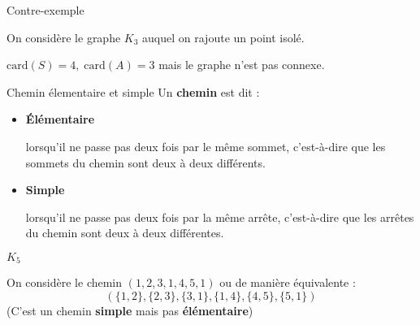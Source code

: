   \begin{Example}{Contre-exemple}{}

  On considère le graphe $K_3$ auquel on rajoute un point isolé.
  \begin{center}
  \end{center}
  $\mathrm{car d}(S) = 4,\; \mathrm{car d}(A) = 3$ mais le graphe n'est pas connexe.
  \end{Example}

  \begin{Definition}[colbacktitle=red!75!black]{Chemin élementaire et simple}{}
  Un \textbf{chemin} est dit :
  \begin{itemize}
      \item \textbf{Élémentaire}
          
          lorsqu'il ne passe pas deux fois par le même sommet, c'est-à-dire que les sommets du chemin sont deux à deux différents.

      \item \textbf{Simple}

          lorsqu'il ne passe pas deux fois par la même arrête, c'est-à-dire que les arrêtes du chemin sont deux à deux différentes.
  \end{itemize}
  \end{Definition}

  \begin{Example}{$K_5$}{}

  On considère le chemin $(1, 2, 3, 1, 4, 5, 1)$ ou de manière équivalente : $$(\{1,2\},\{2, 3\},\{3, 1\},\{1, 4\}, \{4, 5\}, \{5, 1\})$$ (C'est un chemin \textbf{simple} mais pas \textbf{élémentaire})

  \begin{center}
  \end{center}
  \end{Example}

